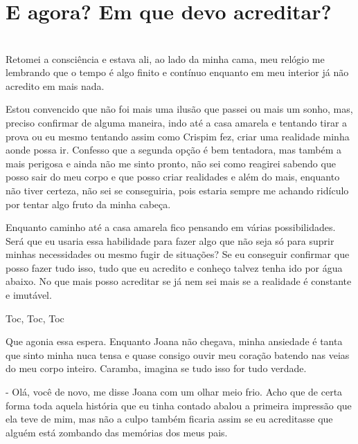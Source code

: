 \newpage
\ifdefined\useChapters
\chapter{E agora? Em que devo acreditar?}
\else
\chapter{}
\fi


Retomei a consciência e estava ali, ao lado da minha cama, meu relógio me lembrando que o tempo é algo finito e contínuo enquanto em meu interior já não acredito em mais nada.

Estou convencido que não foi mais uma ilusão que passei ou mais um sonho, mas, preciso confirmar de alguma maneira, indo até a casa amarela e tentando tirar a prova ou eu mesmo tentando assim como Crispim fez, criar uma realidade minha aonde possa ir. Confesso que a segunda opção é bem tentadora, mas também a mais perigosa e ainda não me sinto pronto, não sei como reagirei sabendo que posso sair do meu corpo e que posso criar realidades e além do mais, enquanto não tiver certeza, não sei se conseguiria, pois estaria sempre me achando ridículo por tentar algo fruto da minha cabeça.

Enquanto caminho até a casa amarela fico pensando em várias possibilidades. Será que eu usaria essa habilidade para fazer algo que não seja só para suprir minhas necessidades ou mesmo fugir de situações? Se eu conseguir confirmar que posso fazer tudo isso, tudo que eu acredito e conheço talvez tenha ido por água abaixo. No que mais posso acreditar se já nem sei mais se a realidade é constante e imutável.

Toc, Toc, Toc

Que agonia essa espera. Enquanto Joana não chegava, minha ansiedade é tanta que sinto minha nuca tensa e quase consigo ouvir meu coração batendo nas veias do meu corpo inteiro. Caramba, imagina se tudo isso for tudo verdade.

- Olá, você de novo, me disse Joana com um olhar meio frio. Acho que de certa forma toda aquela história que eu tinha contado abalou a primeira impressão que ela teve de mim, mas não a culpo também ficaria assim se eu acreditasse que alguém está zombando das memórias dos meus pais.

